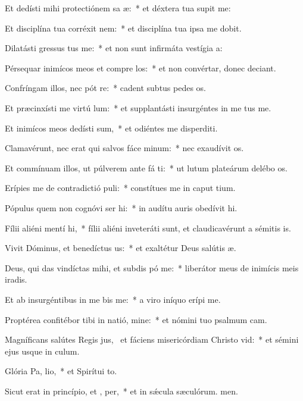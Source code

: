 \item Et dedísti mihi protectiónem sa æ:~* et déxtera tua supit me:
\item Et disciplína tua corréxit   nem:~* et disciplína tua ipsa me dobit.
\item Dilatásti gressus  tus me:~* et non sunt infirmáta vestígia a:
\item Pérsequar inimícos meos et compre los:~* et non convértar, donec deciant.
\item Confríngam illos, nec pót re:~* cadent subtus pedes os.
\item Et præcinxísti me virtú  lum:~* et supplantásti insurgéntes in me tus me.
\item Et inimícos meos dedísti  sum,~* et odiéntes me disperditi.
\item Clamavérunt, nec erat qui salvos fáce  minum:~* nec exaudívit os.
\item Et commínuam illos, ut púlverem ante fá ti:~* ut lutum plateárum delébo os.
\item Erípies me de contradictió puli:~* constítues me in caput tium.
\item Pópulus quem non cognóvi ser hi:~* in audítu auris obedívit hi.
\item Fílii aliéni mentí  hi,~* fílii aliéni inveteráti sunt, et claudicavérunt a sémitis is.
\item Vivit Dóminus, et benedíctus  us:~* et exaltétur Deus salútis æ.
\item Deus, qui das vindíctas mihi, et subdis pó  me:~* liberátor meus de inimícis meis iradis.
\item Et ab insurgéntibus in me bis me:~* a viro iníquo erípi me.
\item Proptérea confitébor tibi in natió, mine:~* et nómini tuo psalmum cam.
\item Magníficans salútes Regis jus,~\pscross{} et fáciens misericórdiam Christo  vid:~* et sémini ejus usque in culum.
\item Glória Pa,  lio,~* et Spirítui to.
\item Sicut erat in princípio, et ,  per,~* et in sǽcula sæculórum. men.
